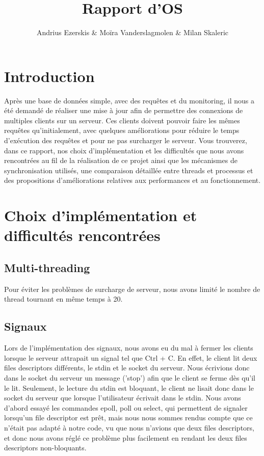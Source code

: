 \documentclass[utf8]{article}
\begin{document}
\begin{titlepage}
    

\author{Andrius Ezerskis \& Moïra Vanderslagmolen \& Milan Skaleric}
\title{Rapport d'OS}

\maketitle
\end{titlepage}

\section{Introduction}
\par

Après une base de données simple, avec des requêtes et du monitoring, il nous a
été demandé de réaliser une mise à jour afin de permettre des connexions de
multiples clients sur un serveur.\newline
Ces clients doivent pouvoir faire les mêmes requêtes qu'initialement, avec
quelques améliorations pour réduire le temps d'exécution des requêtes et pour ne
pas surcharger le serveur. Vous trouverez, dans ce rapport, nos choix
d'implémentation et les difficultés que nous avons rencontrées au fil de la
réalisation de ce projet ainsi que les mécanismes de synchronisation utilisés,
une comparaison détaillée entre threads et processus et des propositions
d'améliorations relatives aux performances et au fonctionnement.
\section{Choix d'implémentation et difficultés rencontrées}
\subsection{Multi-threading}
Pour éviter les problèmes de surcharge de serveur, nous avons limité le nombre
de thread tournant en même temps à 20.
\subsection{Signaux}
\par
\indent

Lors de l'implémentation des signaux, nous avons eu du mal à fermer les clients
lorsque le serveur attrapait un signal tel que Ctrl + C. En effet, le client lit
deux files descriptors différents, le stdin et le socket du serveur. Nous
écrivions donc dans le socket du serveur un message ('stop') afin que le client
se ferme dès qu'il le lit. Seulement, le lecture du stdin est bloquant, le
client ne lisait donc dans le socket du serveur que lorsque l'utilisateur
écrivait dans le stdin. 
\newline
Nous avons d'abord essayé les commandes epoll, poll ou select, qui permettent de
signaler lorsqu'un file descriptor est prêt, mais nous nous sommes rendus compte
que ce n'était pas adapté à notre code, vu que nous n'avions que deux files
descriptors, et donc nous avons réglé ce problème plus facilement en rendant les
deux files descriptors non-bloquants.
\par
\end{document}
